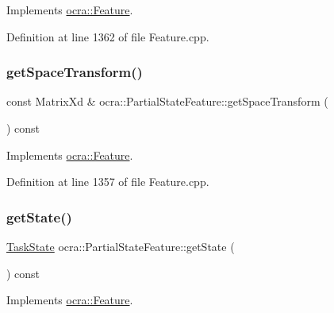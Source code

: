 Implements \hyperlink{classocra_1_1Feature_aeda4c2a5ffe638c3de30f8b91a11450e}{ocra\+::\+Feature}.



Definition at line 1362 of file Feature.\+cpp.

\hypertarget{classocra_1_1PartialStateFeature_ac22525347f868a352d4fa2cab69a12d6}{}\label{classocra_1_1PartialStateFeature_ac22525347f868a352d4fa2cab69a12d6} 
\subsubsection{\texorpdfstring{get\+Space\+Transform()}{getSpaceTransform()}}
{\footnotesize\ttfamily const Matrix\+Xd \& ocra\+::\+Partial\+State\+Feature\+::get\+Space\+Transform (\begin{DoxyParamCaption}{ }\end{DoxyParamCaption}) const\hspace{0.3cm}{\ttfamily [virtual]}}



Implements \hyperlink{classocra_1_1Feature_a77eb324fb4da91fd50d0e761d2453ff3}{ocra\+::\+Feature}.



Definition at line 1357 of file Feature.\+cpp.

\hypertarget{classocra_1_1PartialStateFeature_abb71a3727198affb3d250e6942fb6eee}{}\label{classocra_1_1PartialStateFeature_abb71a3727198affb3d250e6942fb6eee} 
\subsubsection{\texorpdfstring{get\+State()}{getState()}}
{\footnotesize\ttfamily \hyperlink{classocra_1_1TaskState}{Task\+State} ocra\+::\+Partial\+State\+Feature\+::get\+State (\begin{DoxyParamCaption}{ }\end{DoxyParamCaption}) const\hspace{0.3cm}{\ttfamily [virtual]}}



Implements \hyperlink{classocra_1_1Feature_a792434ceb793f25874b8fe42ae24c475}{ocra\+::\+Feature}.



